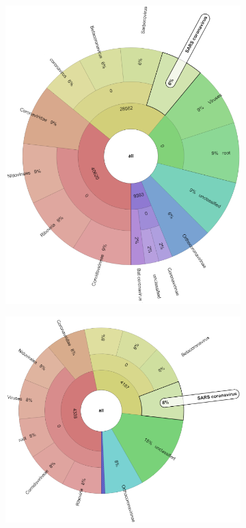     \begin{figure}[H]
        \centering
        \begin{subfigure}[b]{0.3\textwidth}
        \includegraphics[width=1\textwidth]{figures/results/real/krona/krona-uk-sERR5014633.png}
        \label{fig:results:real:krona-uk-a}
        \end{subfigure}
        \hfill
        \begin{subfigure}[b]{0.3\textwidth}
        \includegraphics[width=1\textwidth]{figures/results/real/krona/krona-uk-sERR5014683.png}

\end{subfigure}
\end{figure}

